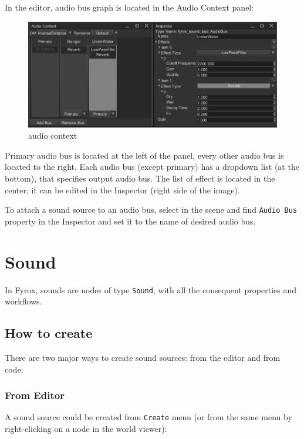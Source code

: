 \documentclass[
]{book}
\theoremstyle{definition}
\theoremstyle{definition}
\theoremstyle{definition}
\theoremstyle{definition}
\theoremstyle{remark}
\begin{document}
In the editor, audio bus graph is located in the Audio Context panel:

\begin{figure}
\centering
\includegraphics{images/sound_audio_context.png}
\caption{audio context}
\end{figure}

Primary audio bus is located at the left of the panel, every other audio bus is located to the right. Each audio bus (except primary) has a dropdown list (at the bottom), that specifies output audio bus. The list of effect is located in the center; it can be edited in the Inspector (right side of the image).

To attach a sound source to an audio bus, select in the scene and find \texttt{Audio\ Bus} property in the Inspector and set it to the name of desired audio bus.

\section{Sound}\label{sound-1}

In Fyrox, sounds are nodes of type \texttt{Sound}, with all the consequent properties and workflows.

\subsection{How to create}\label{how-to-create-13}

There are two major ways to create sound sources: from the editor and from code.

\subsubsection{From Editor}\label{from-editor}

A sound source could be created from \texttt{Create} menu (or from the same menu by right-clicking on a node in the world viewer):
\end{document}
